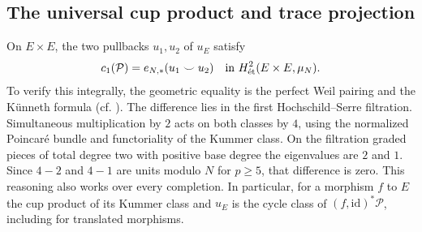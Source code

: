 \documentclass[11pt,a4paper]{article}
\theoremstyle{remark}\newtheorem{remark}[theorem]{Remark}
\begin{document}
\subsection{The universal cup product and trace projection}
On $E\times E$, the two pullbacks $u_1,u_2$ of $u_E$ satisfy
\begin{equation}\label{cup}
 c_1(\mathcal P)=e_{N,*}(u_1\smile u_2)\quad\text{in }H^2_{\mathrm{\acute et}}(E\times E,\mu_N).
\end{equation}
To verify this integrally, the geometric equality is the perfect Weil pairing and the K\"unneth formula (cf. \cite{sz1,sz2}). The difference lies in the first Hochschild--Serre filtration. Simultaneous multiplication by $2$ acts on both classes by $4$, using the normalized Poincar\'e bundle and functoriality of the Kummer class. On the filtration graded pieces of total degree two with positive base degree the eigenvalues are $2$ and $1$. Since $4-2$ and $4-1$ are units modulo $N$ for $p\ge5$, that difference is zero. This reasoning also works over every completion. In particular, for a morphism $f$ to $E$ the cup product of its Kummer class and $u_E$ is the cycle class of $(f,\mathrm{id})^*\mathcal P$, including for translated morphisms.
\end{document}
